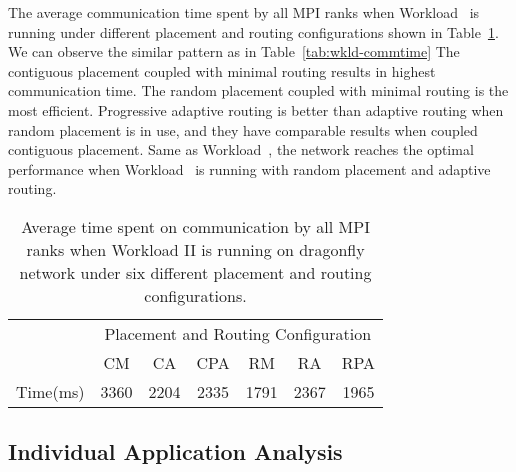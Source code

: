 The average communication time spent by all MPI ranks when Workload~ is running under different placement and routing configurations shown in Table~\ref{tab:syn-wkld-commtime}. 
We can observe the similar pattern as in Table~\ref{tab:wkld-commtime}
The contiguous placement coupled with minimal routing results in highest communication time. 
The random placement coupled with minimal routing is the most efficient. 
Progressive adaptive routing is better than adaptive routing when random placement is in use, 
and they have comparable results when coupled contiguous placement. 
Same as Workload~, the network reaches the optimal performance when Workload~ is running with random placement and adaptive routing. 

\begin{table}[ht]
\begin{center}
\caption{Average time spent on communication by all MPI ranks when Workload II is running on dragonfly network under six different placement and routing configurations.} 
\label{tab:syn-wkld-commtime}
\begin{tabular}{l c c c c c c }
\toprule %
\toprule
&\multicolumn{6}{c}{Placement and Routing Configuration} \\ %
\cmidrule(l){2-7}
          & CM & CA & CPA & RM & RA & RPA \\ %
\midrule %
Time(ms)  & 3360 & 2204 & 2335 & 1791 & 2367 & 1965 \\ %

\midrule %
\bottomrule %
\end{tabular}
\end{center}
\end{table}



\subsection{Individual Application Analysis}
\label{sec: workload-2 app analysis}

